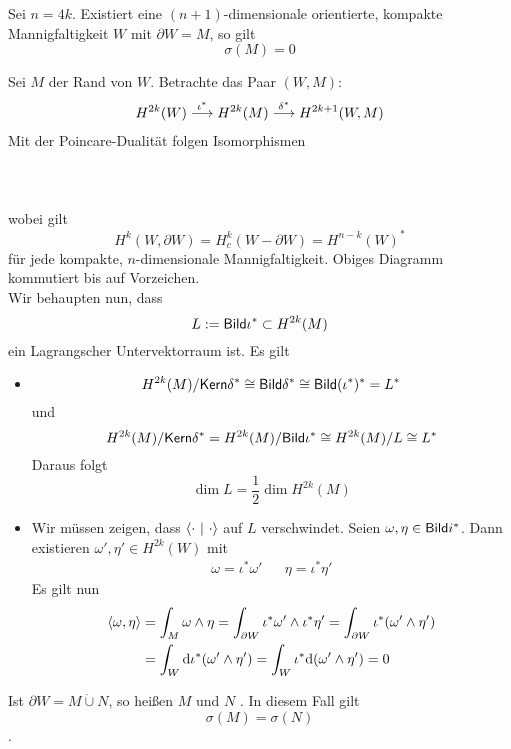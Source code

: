 Sei $n = 4k$. Existiert eine $(n+1)$-dimensionale orientierte, kompakte Mannigfaltigkeit $W$ mit $\partial W = M$, so gilt
\[ \sigma(M) = 0 \]
\begin{Beweis}{}
Sei $M$ der Rand von $W$. Betrachte das Paar $(W,M)$:
\begin{align*}
H^{2k}(W)
\overset{\iota^*}{\longrightarrow} H^{2k}(M)
\overset{\delta^*}{\longrightarrow} H^{2k+1}(W,M) 
\end{align*}
Mit der Poincare-Dualität folgen Isomorphismen\\\\
\\\\
wobei gilt
\[ H^k(W, \partial W) = H^{k}_c(W - \partial W) = H^{n-k}(W)^* \]
für jede kompakte, $n$-dimensionale Mannigfaltigkeit. Obiges Diagramm kommutiert bis auf Vorzeichen.\\
Wir behaupten nun, dass
\[ L:= \textsf{Bild} \iota^* \subset H^{2k}(M) \]
ein Lagrangscher Untervektorraum ist. Es gilt
\begin{itemize}
	\item
	\[H^{2k}(M)/\textsf{Kern} \delta^* \overset{}{\cong} \textsf{Bild} \delta^* \overset{}{\cong} \textsf{Bild} (\iota^*)^* = L^*\]
	und
	\[H^{2k}(M)/\textsf{Kern} \delta^* = H^{2k}(M) / \textsf{Bild} \iota^* \overset{}{\cong} H^{2k}(M)/L \overset{}{\cong} L^*\]
	Daraus folgt
	\[ \dim L = \frac{1}{2} \dim H^{2k}(M) \]
	\item Wir müssen zeigen, dass $\left<\cdot~|~\cdot\right>$ auf $L$ verschwindet. Seien $\omega, \eta \in \textsf{Bild} i^*$. Dann existieren $\omega', \eta' \in H^{2k}(W)$ mit
	\begin{align*}
	\omega = \iota^* \omega' && \eta = \iota^*\eta'
	\end{align*}
	Es gilt nun
	\begin{align*}
		\left<\omega, \eta\right> & = \int_M \omega \wedge \eta = \int_{\partial W} \iota^*\omega' \wedge \iota^* \eta'= \int_{\partial W} \iota^*(\omega'\wedge \eta') \\
		                    & = \int_W \text{d} \iota^*(\omega' \wedge \eta') = \int_W  \iota^*\text{d}(\omega' \wedge \eta') = 0
	\end{align*}
\end{itemize}
\end{Beweis}


\Kor{}
Ist $\partial W = M \dot{\cup} N$, so heißen $M$ und $N$ . In diesem Fall gilt
\[ \sigma(M) = \sigma(N) \].
